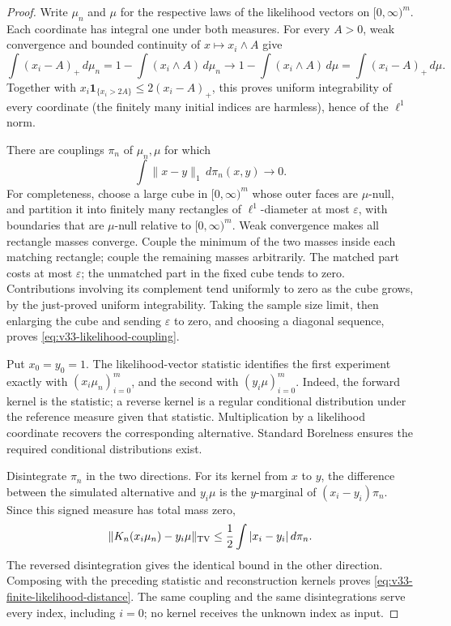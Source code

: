 \begin{proof}
Write \(\mu_n\) and \(\mu\) for the respective laws of the likelihood
vectors on \([0,\infty)^m\).  Each coordinate has integral one under
both measures.  For every \(A>0\), weak convergence and bounded
continuity of \(x\mapsto x_i\wedge A\) give
\[
 \int(x_i-A)_+\,d\mu_n
 =1-\int(x_i\wedge A)\,d\mu_n
 \longrightarrow
 1-\int(x_i\wedge A)\,d\mu
 =\int(x_i-A)_+\,d\mu.
\]
Together with
\(x_i\mathbf1_{\{x_i>2A\}}\le2(x_i-A)_+\), this proves uniform
integrability of every coordinate (the finitely many initial indices
are harmless), hence of the \(\ell^1\) norm.

There are couplings \(\pi_n\) of \(\mu_n,\mu\) for which
\begin{equation}\label{eq:v33-likelihood-coupling}
                  \int\|x-y\|_1\,d\pi_n(x,y)\longrightarrow0.
\end{equation}
For completeness, choose a large cube in \([0,\infty)^m\) whose outer faces
are \(\mu\)-null, and partition it into finitely many rectangles of
\(\ell^1\)-diameter at most \(\varepsilon\), with boundaries that
are \(\mu\)-null relative to \([0,\infty)^m\).
Weak convergence makes all rectangle masses converge.  Couple the
minimum of the two masses inside each matching rectangle; couple the
remaining masses arbitrarily.  The matched part costs at most
\(\varepsilon\); the unmatched part in the fixed cube tends to zero.
Contributions involving its complement tend uniformly to zero as the
cube grows, by the just-proved uniform integrability.  Taking the sample
size limit, then enlarging the cube and sending \(\varepsilon\) to zero,
and choosing a diagonal sequence, proves
\eqref{eq:v33-likelihood-coupling}.

Put \(x_0=y_0=1\).  The likelihood-vector statistic identifies the
first experiment exactly with \((x_i\mu_n)_{i=0}^m\), and the second
with \((y_i\mu)_{i=0}^m\).  Indeed, the forward kernel is the statistic;
a reverse kernel is a regular conditional distribution under the
reference measure given that statistic.  Multiplication by a likelihood
coordinate recovers the corresponding alternative.  Standard Borelness
ensures the required conditional distributions exist.

Disintegrate \(\pi_n\) in the two directions.  For its kernel from
\(x\) to \(y\), the difference between the simulated alternative
and \(y_i\mu\) is the \(y\)-marginal of
\((x_i-y_i)\pi_n\).  Since this signed measure has total mass zero,
\[
 \|K_n(x_i\mu_n)-y_i\mu\|_{\rm TV}
 \le\frac12\int|x_i-y_i|\,d\pi_n.
\]
The reversed disintegration gives the identical bound in the other
direction.  Composing with the preceding statistic and reconstruction
kernels proves \eqref{eq:v33-finite-likelihood-distance}.  The same
coupling and the same disintegrations serve every index, including
\(i=0\); no kernel receives the unknown index as input.
\end{proof}

